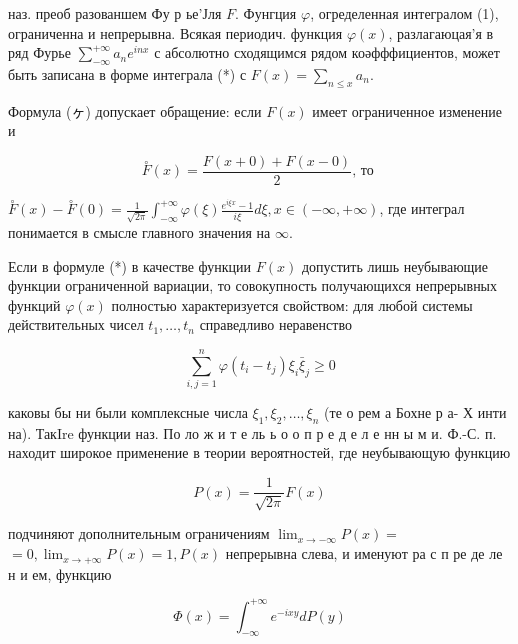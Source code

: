 \documentclass[10pt]{article}
\begin{document}
наз. преоб разованшем Фу р ье'Јля $F$. Фунгция $\varphi$, огределенная интегралом (1), ограниченна и непрерывна. Всякая периодич. функция $\varphi(x)$, разлагаюцая'я в ряд Фурье $\sum_{-\infty}^{+\infty} a_{n} e^{i n x}$ с абсолютно сходящимся рядом коәфффициентов, может быть записана в форме интеграла (*) с $F(x)=\sum_{n \leqslant x} a_{n}$.



Формула (ヶ) допускает обращение: если $F(x)$ имеет ограниченное изменение и



\[

\stackrel{\circ}{F}(x)=\frac{F(x+0)+F(x-0)}{2} \text {, то }

\]



$\stackrel{\circ}{F}(x)-\stackrel{\circ}{F}(0)=\frac{1}{\sqrt{2 \pi}} \int_{-\infty}^{+\infty} \varphi(\xi) \frac{e^{i \xi x}-1}{i \xi} d \xi, x \in(-\infty,+\infty)$, где интеграл понимается в смысле главного значения на $\infty$.



Если в формуле (*) в качестве функции $F(x)$ допустить лишь неубывающие функции ограниченной вариации, то совокупность получающихся непрерывных функций $\varphi(x)$ полностью характеризуется свойством: для любой системы действительных чисел $t_{1}, \ldots, t_{n}$ справедливо неравенство



\[

\sum_{i, j=1}^{n} \varphi\left(t_{i}-t_{j}\right) \xi_{i} \bar{\xi}_{j} \geqslant 0

\]



каковы бы ни были комплексные числа $\xi_{1}, \xi_{2}, \ldots, \xi_{n}$ (те о рем а Бохне р а- Х инти на). ТакIre функции наз. По ло ж и т е ль ь о о п р е д е л е нн ы м и. Ф.-С. п. находит широкое применение в теории вероятностей, где неубывающую функцию



\[

P(x)=\frac{1}{\sqrt{2 \pi}} F(x)

\]



подчиняют дополнительным ограничениям $\lim _{x \rightarrow-\infty} P(x)=$ $=0, \lim _{x \rightarrow+\infty} P(x)=1, P(x)$ непрерывна слева, и именуют ра с п ре де ле н и ем, функцию



\[

\Phi(x)=\int_{-\infty}^{+\infty} e^{-i x y} d P(y)

\]
\end{document}
